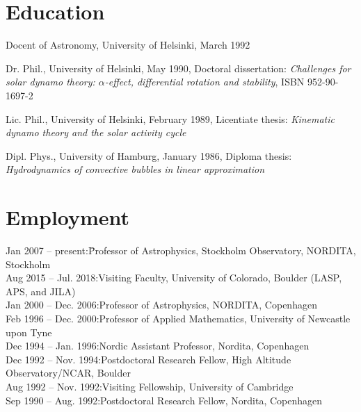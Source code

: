 \documentclass{article}
\begin{document}
\section*{Education}
%
\begin{description}\itemsep-1mm

\item Docent of Astronomy, University of Helsinki, March 1992

\item Dr. Phil., University of Helsinki, May 1990,
Doctoral dissertation: {\em Challenges for solar dynamo theory: 
$\alpha$-effect, differential rotation and stability},
ISBN 952-90-1697-2

\item Lic. Phil., University of Helsinki, February 1989,
Licentiate thesis: {\em Kinematic dynamo theory and the solar activity cycle}

\item Dipl. Phys., University of Hamburg, January 1986,
Diploma thesis: {\em Hydrodynamics of convective bubbles 
in linear approximation}


\end{description}
 
\section*{Employment}
% 
\begin{tabbing}
Jan 2007 -- present:\quad\quad \=Professor of Astrophysics, Stockholm Observatory, NORDITA, Stockholm\\
Aug 2015 -- Jul. 2018:\>Visiting Faculty, University of Colorado, Boulder (LASP, APS, and JILA)\\
Jan 2000 -- Dec. 2006:\>Professor of Astrophysics, NORDITA, Copenhagen\\
Feb 1996 -- Dec. 2000:\>Professor of Applied Mathematics, University of Newcastle upon Tyne\\
Dec 1994 -- Jan. 1996:\>Nordic Assistant Professor, Nordita, Copenhagen\\
Dec 1992 -- Nov. 1994:\>Postdoctoral Research Fellow, High Altitude Observatory/NCAR, Boulder\\
Aug 1992 -- Nov. 1992:\>Visiting Fellowship, University of Cambridge\\
Sep 1990 -- Aug. 1992:\>Postdoctoral Research Fellow, Nordita, Copenhagen\\
\end{tabbing}
\end{document}
